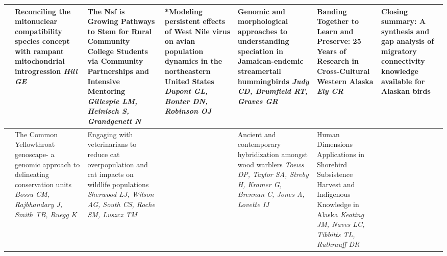 \begin{tabular}{|x{0.75cm}|x{2.25cm}|x{2.25cm}|a{2.25cm}|a{2.25cm}|a{2.25cm}|a{2.25cm}|}
\hline
{}&Reconciling the mitonuclear compatibility species concept with rampant mitochondrial introgression \newline \newline \textit{Hill GE} & The Nsf is Growing Pathways to Stem for Rural Community College Students via Community Partnerships and Intensive Mentoring \newline \newline \textit{Gillespie LM, Heinisch S, Grandgenett N} & *Modeling persistent effects of West Nile virus on avian population dynamics in the northeastern United States \newline \newline \textit{Dupont GL, Bonter DN, Robinson OJ} & Genomic and morphological approaches to understanding speciation in Jamaican-endemic streamertail hummingbirds \newline \newline \textit{Judy CD, Brumfield RT, Graves GR} & Banding Together to Learn and Preserve: 25 Years of Research in Cross-Cultural Western Alaska \newline \newline \textit{Ely CR} & Closing summary: A synthesis and gap analysis of migratory connectivity knowledge available for Alaskan birds \newline \newline \textit{}\\
\hline
{}&The Common Yellowthroat genoscape- a genomic approach to delineating conservation units \newline \newline \textit{Bossu CM, Rajbhandary J, Smith TB, Ruegg K} & Engaging with veterinarians to reduce cat overpopulation and cat impacts on wildlife populations \newline \newline \textit{Sherwood LJ, Wilson AG, South CS, Roche SM, Luszcz TM} &  \newline \newline \textit{} & Ancient and contemporary hybridization amongst wood warblers \newline \newline \textit{Toews DP, Taylor SA, Streby H, Kramer G, Brennan C, Jones A, Lovette IJ} & Human Dimensions Applications in Shorebird Subsistence Harvest and Indigenous Knowledge in Alaska \newline \newline \textit{Keating JM, Naves LC, Tibbitts TL, Ruthrauff DR} &  \newline \newline \textit{}\\

\end{tabular}
